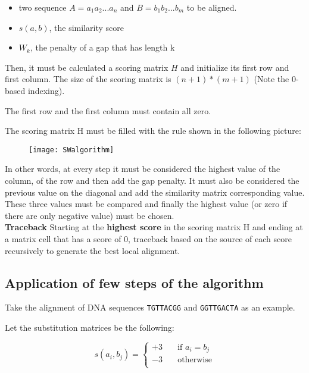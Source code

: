\begin{itemize}
	\item two sequence $A = a_{1}a_{2}...a_{n}$ and 
		$B = b_{1}b_{2}...b_{m}$ to be aligned.
	\item $s(a,b)$, the similarity score
    \item $W_k$, the penalty of a gap that has length k
\end{itemize}

Then, it must be calculated a scoring matrix $H$ and initialize its first 
row and first column. 
The size of the scoring matrix is $(n + 1)*(m + 1)$ (Note the 0-based 
indexing).

The first row and the first column must contain all zero.

The scoring matrix H must be filled with the rule shown in the following
picture:

\begin{figure}[H]
  \centering
  \texttt{[image: SWalgorithm]}
\end{figure}

In other words, at every step it must be considered the highest value
of the column, of the row and then add the gap penalty. It must also
be considered the previous value on the diagonal and add the
similarity matrix corresponding value. These three values must be
compared and finally the highest value (or zero if there are only
negative value) must be chosen. \\

\textbf{Traceback} 
Starting at the \textbf{highest score} in the scoring matrix H and ending at a 
matrix cell that has a score of 0, traceback based on the source of 
each score recursively to generate the best local alignment.

\subsection{Application of few steps of the algorithm}

Take the alignment of DNA sequences \texttt{TGTTACGG} and 
\texttt{GGTTGACTA} as an example. 

Let the substitution matrices be the following:

\[ s(a_i,b_j) =
  \begin{cases}
    +3       & \quad \text{if } a_i = b_j\\
    -3	     & \quad \text{otherwise} \\
  \end{cases}
\]


